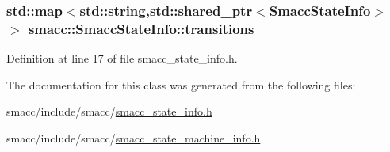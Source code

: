 \subsubsection[{\texorpdfstring{transitions\+\_\+}{transitions_}}]{\setlength{\rightskip}{0pt plus 5cm}std\+::map$<$std\+::string,std\+::shared\+\_\+ptr$<${\bf Smacc\+State\+Info}$>$ $>$ smacc\+::\+Smacc\+State\+Info\+::transitions\+\_\+}\hypertarget{classsmacc_1_1SmaccStateInfo_ad9a57f1532506ff82a2885e854f6132f}{}\label{classsmacc_1_1SmaccStateInfo_ad9a57f1532506ff82a2885e854f6132f}


Definition at line 17 of file smacc\+\_\+state\+\_\+info.\+h.



The documentation for this class was generated from the following files\+:\begin{DoxyCompactItemize}
\item 
smacc/include/smacc/\hyperlink{smacc__state__info_8h}{smacc\+\_\+state\+\_\+info.\+h}\item 
smacc/include/smacc/\hyperlink{smacc__state__machine__info_8h}{smacc\+\_\+state\+\_\+machine\+\_\+info.\+h}\end{DoxyCompactItemize}

